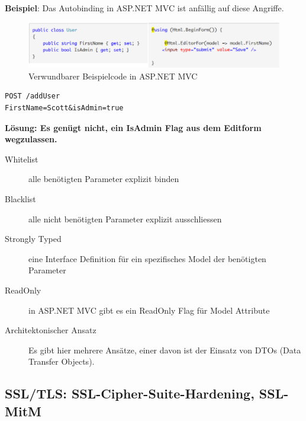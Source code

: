 \textbf{Beispiel}: Das Autobinding in ASP.NET MVC ist anfällig auf diese Angriffe.
\begin{figure}[H]
	\centering
	\includegraphics[width=\textwidth]{./img/mass-assignment-vulnerability}
	\caption{Verwundbarer Beispielcode in ASP.NET MVC}
\end{figure}
\begin{lstlisting}[language={},caption=Beispiel eines präparierten Requests zum Setzen eines nicht vorgesehenen Parameters]
POST /addUser
FirstName=Scott&isAdmin=true
\end{lstlisting}

\textbf{Lösung: Es genügt nicht, ein IsAdmin Flag aus dem Editform wegzulassen.}

\begin{description}
	\item[Whitelist] alle benötigten Parameter explizit binden
	\item[Blacklist] alle nicht benötigten Parameter explizit ausschliessen
	\item[Strongly Typed] eine Interface Definition für ein spezifisches Model der benötigten Parameter
	\item[ReadOnly] in ASP.NET MVC gibt es ein ReadOnly Flag für Model Attribute
	\item[Architektonischer Ansatz] Es gibt hier mehrere Ansätze, einer davon ist der Einsatz von DTOs (Data Transfer Objects).
\end{description}

\subsection{SSL/TLS: SSL-Cipher-Suite-Hardening, SSL-MitM}

